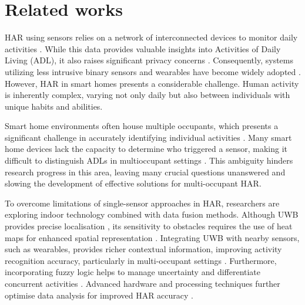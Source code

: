 \section{Related works}
\label{sec:related-works}



HAR using sensors relies on a network of interconnected devices to monitor daily activities \cite{qiu2022multi}. While this data provides valuable insights into Activities of Daily Living (ADL), it also raises significant privacy concerns \cite{yang2017survey}. Consequently, systems utilizing less intrusive binary sensors and wearables have become widely adopted \cite{abade2018non}.  However, HAR in smart homes presents a considerable challenge. Human activity is inherently complex, varying not only daily but also between individuals with unique habits and abilities.

Smart home environments often house multiple occupants, which presents a significant challenge in accurately identifying individual activities \cite{li2020multi}. Many smart home devices lack the capacity to determine who triggered a sensor, making it difficult to distinguish ADLs in multioccupant settings \cite{bouchabou2021survey}.  This ambiguity hinders research progress in this area, leaving many crucial questions unanswered and slowing the development of effective solutions for multi-occupant HAR.

To overcome limitations of single-sensor approaches in HAR, researchers are exploring indoor technology combined with data fusion methods. Although UWB provides precise localisation \cite{khan2024occupancy, zhan2021mosen}, its sensitivity to obstacles requires the use of heat maps for enhanced spatial representation \cite{naser2020adaptive, yuan2024self, polodMultiOccupantTracking2024}. Integrating UWB with nearby sensors, such as wearables, provides richer contextual information, improving activity recognition accuracy, particularly in multi-occupant settings \cite{zhang2022deep, polodMultiOccupantTracking2024}. Furthermore, incorporating fuzzy logic helps to manage uncertainty and differentiate concurrent activities \cite{yang2021survey, polo2024human}. Advanced hardware and processing techniques further optimise data analysis for improved HAR accuracy \cite{javaid2021sensors}.

